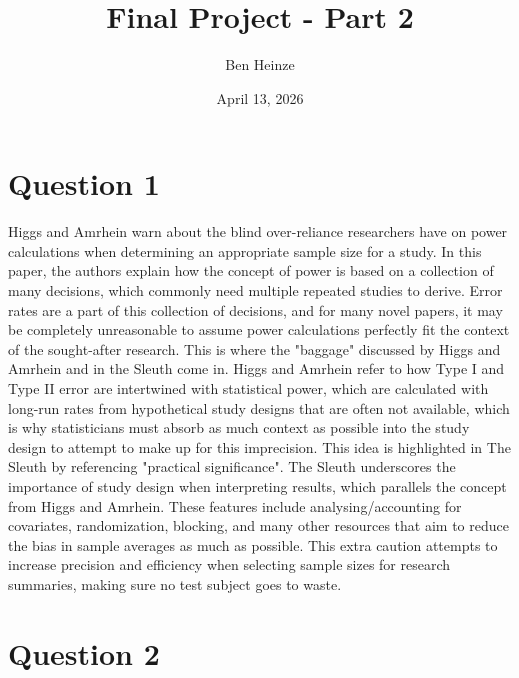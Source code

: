 \documentclass[11pt]{article}
\author{Ben Heinze}
\date{April 13, 2026}
\title{Final Project - Part 2}
\begin{document}
\maketitle


\section{Question 1}
\label{sec:org85fb003}

Higgs and Amrhein warn about the blind over-reliance researchers have on power calculations when determining an appropriate sample size for a study.
In this paper, the authors explain how the concept of power is based on a collection of many decisions, which commonly need multiple repeated studies to derive.
Error rates are a part of this collection of decisions, and for many novel papers, it may be completely unreasonable to assume power calculations perfectly fit the context of the sought-after research.
This is where the "baggage" discussed by Higgs and Amrhein and in the Sleuth come in. Higgs and Amrhein refer to how Type I and Type II error are intertwined with statistical power, which are calculated with long-run rates from hypothetical study designs that are often not available, which is why statisticians must absorb as much context as possible into the study design to attempt to make up for this imprecision. This idea is highlighted in The Sleuth by referencing "practical significance". The Sleuth underscores the importance of study design when interpreting results, which parallels the concept from Higgs and Amrhein. These features include analysing/accounting for covariates, randomization, blocking, and many other resources that aim to reduce the bias in sample averages as much as possible.
This extra caution attempts to increase precision and efficiency when selecting sample sizes for research summaries, making sure no test subject goes to waste.

\newpage

\section{Question 2}
\label{sec:org7fb76ed}
\end{document}
